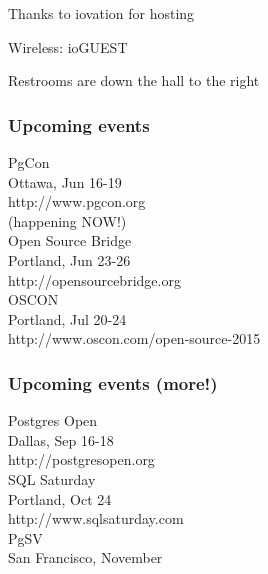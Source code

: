 \documentclass{beamer}
\begin{document}

\frame
{
  \begin{center}
  \item[]Thanks to iovation for hosting
  \item[]Wireless: ioGUEST
  \item[]Restrooms are down the hall to the right
  \end{center}
}

\frame
{
  \frametitle{Upcoming events}
  \begin{center}
{\large PgCon\\}
Ottawa, Jun 16-19\\
http://www.pgcon.org\\
(happening NOW!)\\
\vspace{5 mm}
{\large Open Source Bridge\\}
Portland, Jun 23-26\\
http://opensourcebridge.org\\
\vspace{5 mm}
{\large OSCON\\}
Portland, Jul 20-24\\
http://www.oscon.com/open-source-2015\\
\vspace{5 mm}
  \end{center}
}

\frame
{
  \frametitle{Upcoming events (more!)}
  \begin{center}
{\large Postgres Open\\}
Dallas, Sep 16-18\\
http://postgresopen.org\\
\vspace{5 mm}
{\large SQL Saturday\\}
Portland, Oct 24\\
http://www.sqlsaturday.com\\
\vspace{5 mm}
{\large PgSV\\}
San Francisco, November\\
  \end{center}
}

\end{document}
